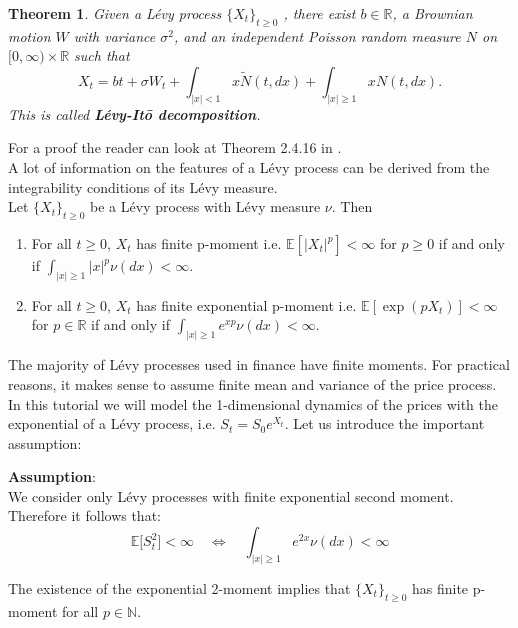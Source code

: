 \documentclass[a4paper,10pt]{article}
\newcommand{\numberset}{\mathbb}
\newcommand{\N}{\numberset{N}}
\newcommand{\R}{\numberset{R}}
\newcommand{\E}{\numberset{E}}
\newtheorem{Theorem}{Theorem}[section]
\newenvironment{riquadro}[1]
{\setlength{\dimen255}{\parindent}%
\begin{lrbox}{\riquadrobox}\begin{minipage}{#1}
\setlength{\parindent}{\dimen255}}
{\end{minipage}\end{lrbox}\fbox{\usebox{\riquadrobox}}}
\begin{document}
\begin{Theorem}
 Given a Lévy process $\{X_t\}_{t \ge 0}$ , there exist $b\in \R$, a Brownian motion $W$ with variance $\sigma^2$, and an 
 independent Poisson random measure $N$ on $[0,\infty) \times \R$ such that
 \begin{equation}\label{Levy_Ito}
  X_t = bt + \sigma W_t + \int_{|x|<1} x \tilde{N}(t,dx) + \int_{|x|\geq1} x N(t,dx).
 \end{equation}
 This is called \textbf{Lévy-It\={o} decomposition}.
\end{Theorem}
 For a proof the reader can look at Theorem 2.4.16 in \cite{Applebaum}.\\
A lot of information on the features of a Lévy process can be derived from the integrability conditions of its Lévy measure.\\ 
Let $\{X_t\}_{t\geq0}$ be a Lévy process with Lévy measure $\nu$. Then
\begin{enumerate}
  \item For all $t\geq0$, $X_t$ has finite p-moment i.e. 
  $\E[|X_t|^p]<\infty$ for $p\geq0$ if and only if $\int_{|x| \geq 1} |x|^p \nu(dx) <\infty$.
  \item For all $t\geq0$, $X_t$ has finite exponential p-moment i.e. $\E[\exp(pX_t)]<\infty$ for $p\in \R$ if and only if 
  $\int_{|x| \geq 1} e^{xp} \nu(dx) <\infty$.
\end{enumerate}

The majority of Lévy processes used in finance have finite moments.
For practical reasons, it makes sense to assume finite mean and variance of the price process.
In this tutorial we will model the 1-dimensional dynamics of the prices with the exponential of a Lévy process, 
i.e. $S_t = S_0 e^{X_t}$. Let us introduce the important assumption:  
\begin{center}
\begin{riquadro}{12cm}
\textbf{Assumption}:\\
We consider only Lévy processes with finite exponential second moment.\\
Therefore it follows that:
\begin{equation}\label{AssumptionEM}
\E\bigl[ S_t^2 \bigr] < \infty \quad \Leftrightarrow  \quad \int_{|x| \geq 1} e^{2x} \nu(dx) <\infty  
\end{equation}
\end{riquadro}
\end{center}

The existence of the exponential 2-moment implies that $\{X_t\}_{t \geq 0}$ has finite p-moment for all $p \in \N$.
\end{document}
